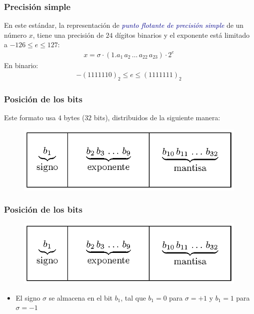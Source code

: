 \documentclass[12pt]{beamer}
\begin{document}
\begin{frame}
\frametitle{Precisión simple}
En este estándar, la representación de \emph{\textcolor{darkblue}{punto flotante de precisión simple}} de un número $x$, tiene una precisión de $24$ dígitos binarios y el exponente está limitado a $-126 \leq e \leq 127$:
\pause
\begin{align*}
x = \sigma \cdot (1.a_{1} \, a_{2} \, \ldots \, a_{22} \, a_{23}) \cdot 2^{e}
\end{align*}
\pause
En binario:
\pause
\begin{align*}
-(1111110)_{2} \leq e \leq (1111111)_{2}
\end{align*}
\end{frame}
\begin{frame}
\frametitle{Posición de los bits}
Este formato usa $4$ bytes ($32$  bits), distribuidos de la siguiente manera:
\pause
\begin{figure}
    \centering
    \includegraphics[scale=1.2]{Imagenes/precision_simple.eps}
\end{figure}
\end{frame}
\begin{frame}
\frametitle{Posición de los bits}
\begin{figure}
    \centering
    \includegraphics[scale=1.2]{Imagenes/precision_simple.eps}
\end{figure}
\begin{itemize}
\item[\ding{212}] El \textcolor{lava}{signo} $\sigma$ se almacena en el bit $b_{1}$, tal que $b_{1} = 0$ para $\sigma = +1$ y $b_{1} = 1$ para $\sigma = -1$
\end{itemize}
\end{frame}
\end{document}
